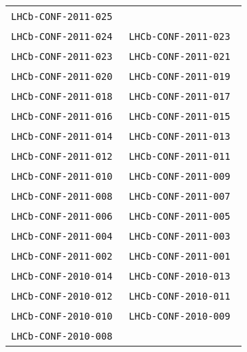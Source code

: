 \begin{center}
\begin{longtable}{ll}
\texttt{LHCb-CONF-2011-025}~\cite{LHCb-CONF-2011-025} \\
\texttt{LHCb-CONF-2011-024}~\cite{LHCb-CONF-2011-024} &
\texttt{LHCb-CONF-2011-023}~\cite{LHCb-CONF-2011-023} \\
\texttt{LHCb-CONF-2011-023}~\cite{LHCb-CONF-2011-022} &
\texttt{LHCb-CONF-2011-021}~\cite{LHCb-CONF-2011-021} \\
\texttt{LHCb-CONF-2011-020}~\cite{LHCb-CONF-2011-020} &
\texttt{LHCb-CONF-2011-019}~\cite{LHCb-CONF-2011-019} \\
\texttt{LHCb-CONF-2011-018}~\cite{LHCb-CONF-2011-018} &
\texttt{LHCb-CONF-2011-017}~\cite{LHCb-CONF-2011-017} \\
\texttt{LHCb-CONF-2011-016}~\cite{LHCb-CONF-2011-016} &
\texttt{LHCb-CONF-2011-015}~\cite{LHCb-CONF-2011-015} \\
\texttt{LHCb-CONF-2011-014}~\cite{LHCb-CONF-2011-014} &
\texttt{LHCb-CONF-2011-013}~\cite{LHCb-CONF-2011-013} \\
\texttt{LHCb-CONF-2011-012}~\cite{LHCb-CONF-2011-012} &
\texttt{LHCb-CONF-2011-011}~\cite{LHCb-CONF-2011-011} \\
\texttt{LHCb-CONF-2011-010}~\cite{LHCb-CONF-2011-010} &
\texttt{LHCb-CONF-2011-009}~\cite{LHCb-CONF-2011-009} \\
\texttt{LHCb-CONF-2011-008}~\cite{LHCb-CONF-2011-008} &
\texttt{LHCb-CONF-2011-007}~\cite{LHCb-CONF-2011-007} \\
\texttt{LHCb-CONF-2011-006}~\cite{LHCb-CONF-2011-006} &
\texttt{LHCb-CONF-2011-005}~\cite{LHCb-CONF-2011-005} \\
\texttt{LHCb-CONF-2011-004}~\cite{LHCb-CONF-2011-004} &
\texttt{LHCb-CONF-2011-003}~\cite{LHCb-CONF-2011-003} \\
\texttt{LHCb-CONF-2011-002}~\cite{LHCb-CONF-2011-002} &
\texttt{LHCb-CONF-2011-001}~\cite{LHCb-CONF-2011-001} \\
\midrule
\texttt{LHCb-CONF-2010-014}~\cite{LHCb-CONF-2010-014} &
\texttt{LHCb-CONF-2010-013}~\cite{LHCb-CONF-2010-013} \\
\texttt{LHCb-CONF-2010-012}~\cite{LHCb-CONF-2010-012} &
\texttt{LHCb-CONF-2010-011}~\cite{LHCb-CONF-2010-011} \\
\texttt{LHCb-CONF-2010-010}~\cite{LHCb-CONF-2010-010} &
\texttt{LHCb-CONF-2010-009}~\cite{LHCb-CONF-2010-009} \\
\texttt{LHCb-CONF-2010-008}~\cite{LHCb-CONF-2010-008} & \\
\bottomrule
\end{longtable}
\end{center}

